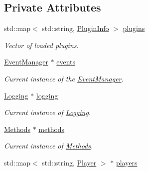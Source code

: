 \subsection*{Private Attributes}
\begin{DoxyCompactItemize}
\item 
\hypertarget{classPluginManager_a4a7dea3948d652d9a4428a237d5af805}{std\-::map$<$ std\-::string, \hyperlink{structPluginInfo}{Plugin\-Info} $>$ \hyperlink{classPluginManager_a4a7dea3948d652d9a4428a237d5af805}{plugins}}\label{classPluginManager_a4a7dea3948d652d9a4428a237d5af805}

\begin{DoxyCompactList}\small\item\em Vector of loaded plugins. \end{DoxyCompactList}\item 
\hypertarget{classPluginManager_a7966d86165aaa504ae4dd12f084d4cfa}{\hyperlink{classEventManager}{Event\-Manager} $\ast$ \hyperlink{classPluginManager_a7966d86165aaa504ae4dd12f084d4cfa}{events}}\label{classPluginManager_a7966d86165aaa504ae4dd12f084d4cfa}

\begin{DoxyCompactList}\small\item\em Current instance of the \hyperlink{classEventManager}{Event\-Manager}. \end{DoxyCompactList}\item 
\hypertarget{classPluginManager_a075528fc6c227b7a9f741d4f01706efc}{\hyperlink{classLogging}{Logging} $\ast$ \hyperlink{classPluginManager_a075528fc6c227b7a9f741d4f01706efc}{logging}}\label{classPluginManager_a075528fc6c227b7a9f741d4f01706efc}

\begin{DoxyCompactList}\small\item\em Current instance of \hyperlink{classLogging}{Logging}. \end{DoxyCompactList}\item 
\hypertarget{classPluginManager_ab66d35133c5a85b1e8b691452257bd5f}{\hyperlink{classMethods}{Methods} $\ast$ \hyperlink{classPluginManager_ab66d35133c5a85b1e8b691452257bd5f}{methods}}\label{classPluginManager_ab66d35133c5a85b1e8b691452257bd5f}

\begin{DoxyCompactList}\small\item\em Current instance of \hyperlink{classMethods}{Methods}. \end{DoxyCompactList}\item 
\hypertarget{classPluginManager_a2a01933dca1c7f1f14ac47c57f86b10b}{std\-::map$<$ std\-::string, \hyperlink{structPlayer}{Player} $>$ $\ast$ \hyperlink{classPluginManager_a2a01933dca1c7f1f14ac47c57f86b10b}{players}}\label{classPluginManager_a2a01933dca1c7f1f14ac47c57f86b10b}


\end{DoxyCompactItemize}
